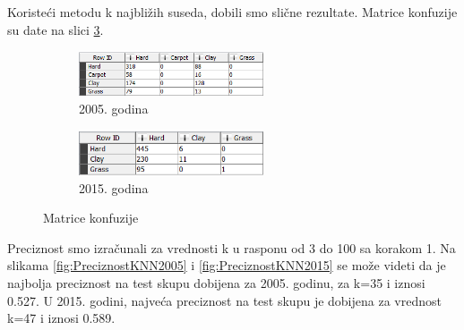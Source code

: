 \documentclass[a4paper]{article}
\begin{document}
Koristeći metodu k najbližih suseda, dobili smo slične rezultate.
Matrice konfuzije su date na slici \ref{fig:MatricaKonfuzije}.

\begin{figure}[H]
	\begin{subfigure}[h]{\textwidth}
		\begin{center}
			\includegraphics[width=0.6\textwidth]{Klasifikacija/kNN/MatricaKonfuzije2005.png}
		\end{center}
		\caption{2005. godina}
		\label{fig:MatricaKnfuzijeg2005}
	\end{subfigure}
	
	\vspace{0.5cm}
	\begin{subfigure}[h]{\textwidth}
		\begin{center}
			\includegraphics[width=0.6\textwidth]{Klasifikacija/kNN/MatricaKonfuzije2015.png}
		\end{center}
		\caption{2015. godina}
		\label{fig:MatricaKnfuzijeg2015}
	\end{subfigure}
	\caption{Matrice konfuzije}
	\label{fig:MatricaKonfuzije}
\end{figure}

Preciznost smo izračunali za vrednosti k u rasponu od 3 do 100 sa korakom 1. Na slikama \ref{fig:PreciznostKNN2005} i \ref{fig:PreciznostKNN2015} se može videti
da je najbolja preciznost na test skupu dobijena za 2005. godinu, za k=35 i iznosi 0.527.
U 2015. godini, najveća preciznost na test skupu je dobijena za vrednost k=47 i iznosi 0.589.
\end{document}
